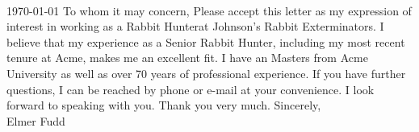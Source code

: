 %
%

\newcommand{\doctype}{Cover Letter}


\resheading{}
\vspace{5.0em} \\

\newcommand{\position}{Rabbit Hunter}
\newcommand{\employer}{Johnson's Rabbit Exterminators}

\today
\newline\newline
To whom it may concern,
\newline\newline
Please accept this letter as my expression of interest in working as a \position \space at \employer. I believe that my experience as a Senior Rabbit Hunter, including my most recent tenure at Acme, makes me an excellent fit.
\newline\newline
I have an Masters from Acme University as well as over 70 years of professional experience.
\newline\newline
If you have further questions, I can be reached by phone or e-mail at your convenience. I look forward to speaking with you.
\newline\newline
Thank you very much.
\newline\newline
Sincerely,\\
\vspace{1em}
Elmer Fudd



